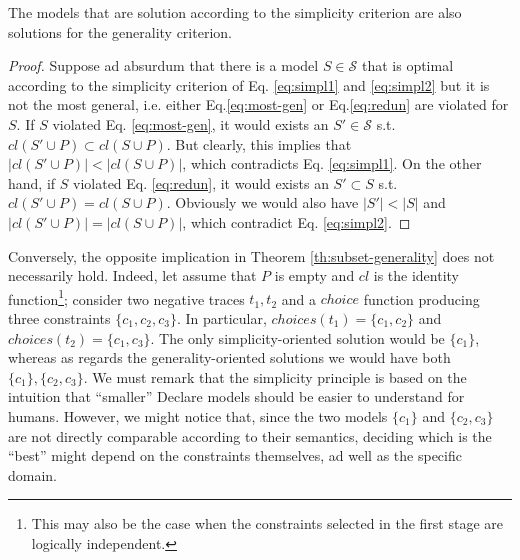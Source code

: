 
\theoremstyle{definition}\label{th:subset-generality}
\begin{theorem}{}
The models that are solution according to the simplicity criterion are also solutions for the generality criterion.
\end{theorem} 
\begin{proof}
Suppose ad absurdum that there is a model $S\in\mathcal{S}$ that is optimal according to the simplicity criterion of Eq. \ref{eq:simpl1} and \ref{eq:simpl2} but it is not the most general, i.e. either Eq.\ref{eq:most-gen} or Eq.\ref{eq:redun} are violated for $S$. If $S$ violated Eq. \ref{eq:most-gen}, it would exists an $S'\in\mathcal{S}$ s.t. $cl(S'\cup P)\subset cl(S\cup P)$. But clearly, this implies that $|cl(S'\cup P)| < |cl(S\cup P)|$, which contradicts Eq. \ref{eq:simpl1}. On the other hand, if $S$ violated Eq. \ref{eq:redun}, it would exists an $S' \subset S$ s.t. $cl(S'\cup P)=cl(S\cup P)$. Obviously we would also have $|S'| < |S|$ and $|cl(S'\cup P)|=|cl(S\cup P)|$, which contradict Eq. \ref{eq:simpl2}. 
\end{proof}

Conversely, the opposite implication in Theorem \ref{th:subset-generality} does not necessarily hold. Indeed, let assume that $P$ is empty and $cl$ is the identity function\footnote{This may also be the case when the constraints selected in the first stage are logically independent.}; consider two negative traces $t_1, t_2$ and a $choice$ function producing three constraints $\{c_1, c_2,c_3\}$. In particular, $choices(t_1)=\{c_1, c_2\}$ and $choices(t_2)=\{c_1, c_3\}$. The only simplicity-oriented solution would be  $\{c_1\}$, whereas as regards the generality-oriented solutions we would have both $\{c_1\}, \{c_2, c_3\}$. We must remark that the simplicity principle is based on the intuition that ``smaller'' Declare models should be easier to understand for humans. However, we might notice that, since the two models $\{c_1\}$ and $\{c_2, c_3\}$ are not directly comparable according to their semantics, deciding which is the ``best'' might depend on the constraints themselves, ad well as the specific domain.




